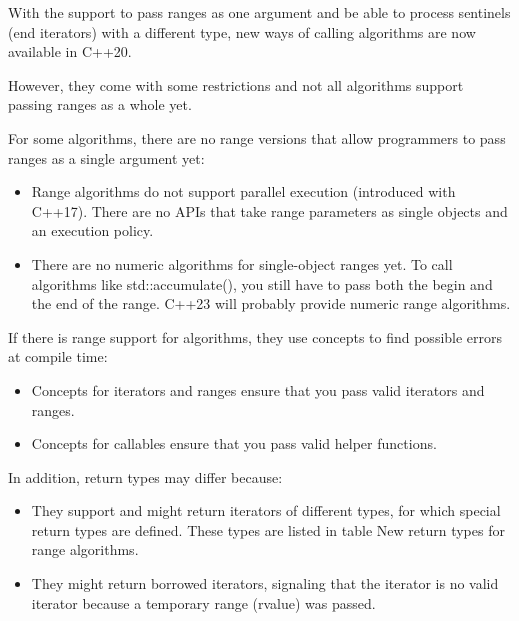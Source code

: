 
With the support to pass ranges as one argument and be able to process sentinels (end iterators) with a different type, new ways of calling algorithms are now available in C++20.

However, they come with some restrictions and not all algorithms support passing ranges as a whole yet.


For some algorithms, there are no range versions that allow programmers to pass ranges as a single argument yet:

\begin{itemize}
\item
Range algorithms do not support parallel execution (introduced with C++17). There are no APIs that take range parameters as single objects and an execution policy.

\item
There are no numeric algorithms for single-object ranges yet. To call algorithms like std::accumulate(), you still have to pass both the begin and the end of the range. C++23 will probably provide numeric range algorithms.
\end{itemize}

If there is range support for algorithms, they use concepts to find possible errors at compile time:

\begin{itemize}
\item
Concepts for iterators and ranges ensure that you pass valid iterators and ranges.

\item
Concepts for callables ensure that you pass valid helper functions.
\end{itemize}

In addition, return types may differ because:

\begin{itemize}
\item
They support and might return iterators of different types, for which special return types are defined. These types are listed in table New return types for range algorithms.

\item
They might return borrowed iterators, signaling that the iterator is no valid iterator because a temporary range (rvalue) was passed.
\end{itemize}


